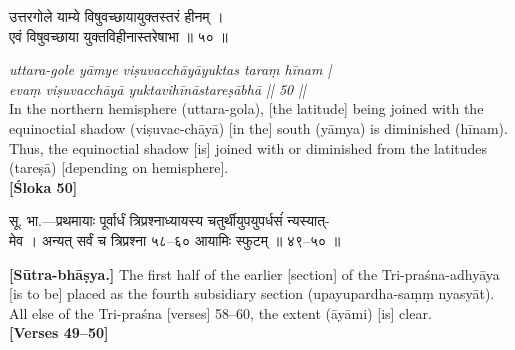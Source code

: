 \documentclass[11pt,a4paper]{article}
\newcommand{\dev}[1]{{\devanagarifont #1}}
\newcommand{\bilingualpair}[2]{%
  \noindent%
  \begin{minipage}[t]{0.48\textwidth}
    #1%
  \end{minipage}%
  \hfill%
  \begin{minipage}[t]{0.48\textwidth}
    #2%
  \end{minipage}%
  \par\vspace{0.5em}%
}
\newenvironment{sanskritcol}{\devanagarifont\small}{}
\newenvironment{englishcol}{\iastfont\small}{}
\begin{document}
\vspace{0.5cm}
\bilingualpair{%
\begin{sanskritcol}
\dev{उत्तरगोले याम्ये विषुवच्छायायुक्तस्तरं हीनम् ।}\\[0.3em]
\dev{एवं विषुवच्छाया युक्तविहीनास्तरेषाभा ॥ ५० ॥}
\end{sanskritcol}%
}{%
\begin{englishcol}
\textit{uttara-gole yāmye viṣuvacchāyāyuktas taraṃ hīnam |}\\[0.3em]
\textit{evaṃ viṣuvacchāyā yuktavihīnāstareṣābhā || 50 ||}\\[0.3em]
In the northern hemisphere (uttara-gola), [the latitude] being joined with the equinoctial shadow (viṣuvac-chāyā) [in the] south (yāmya) is diminished (hīnam). Thus, the equinoctial shadow [is] joined with or diminished from the latitudes (tareṣā) [depending on hemisphere].\\[0.3em]
\hfill \textbf{[Śloka 50]}
\end{englishcol}%
}

\vspace{0.3cm}
\bilingualpair{%
\begin{sanskritcol}
\dev{सू. भा.---प्रथमायाः पूर्वार्धं त्रिप्रश्नाध्यायस्य चतुर्थीयुपयुपर्धसंं न्यस्यात्-}\\[0.3em]
\dev{मेव । अन्यत् सर्वं च त्रिप्रश्ना ५८--६० आयामिः स्फुटम् ॥ ४९--५० ॥}
\end{sanskritcol}%
}{%
\begin{englishcol}
\textbf{[Sūtra-bhāṣya.]} The first half of the earlier [section] of the Tri-praśna-\-adhyāya [is to be] placed as the fourth subsidiary section (upayupardha-saṃṃ nyasyāt). All else of the Tri-\-praśna [verses] 58--60, the extent (āyāmi) [is] clear.\\[0.3em]
\hfill \textbf{[Verses 49--50]}
\end{englishcol}%
}
\end{document}
